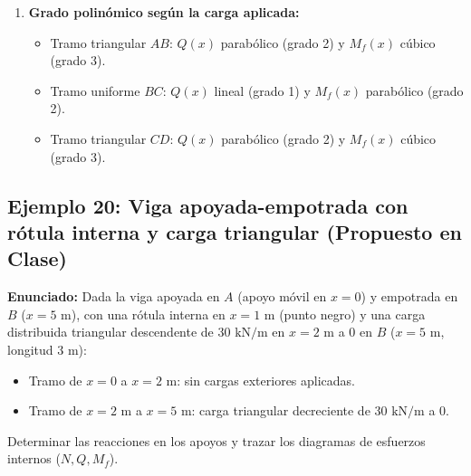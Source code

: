 {\begin{enumerate}
        \item \textbf{Grado polinómico según la carga aplicada:}
              \begin{itemize}
                  \item Tramo triangular $AB$: $Q(x)$ parabólico (grado 2) y $M_f(x)$ cúbico (grado 3).
                  \item Tramo uniforme $BC$: $Q(x)$ lineal (grado 1) y $M_f(x)$ parabólico (grado 2).
                  \item Tramo triangular $CD$: $Q(x)$ parabólico (grado 2) y $M_f(x)$ cúbico (grado 3).
              \end{itemize}
    \end{enumerate}
}

\subsection{Ejemplo 20: Viga apoyada-empotrada con rótula interna y carga triangular (Propuesto en Clase)}

\textbf{Enunciado:}
Dada la viga apoyada en $A$ (apoyo móvil en $x = 0$) y empotrada en $B$ ($x = 5\text{ m}$), con una rótula interna en $x = 1\text{ m}$ (punto negro) y una carga distribuida triangular descendente de $30\text{ kN/m}$ en $x = 2\text{ m}$ a $0$ en $B$ ($x = 5\text{ m}$, longitud $3\text{ m}$):
\begin{itemize}
    \item Tramo de $x=0$ a $x=2\text{ m}$: sin cargas exteriores aplicadas.
    \item Tramo de $x=2\text{ m}$ a $x=5\text{ m}$: carga triangular decreciente de $30\text{ kN/m}$ a $0$.
\end{itemize}

Determinar las reacciones en los apoyos y trazar los diagramas de esfuerzos internos ($N, Q, M_f$).

